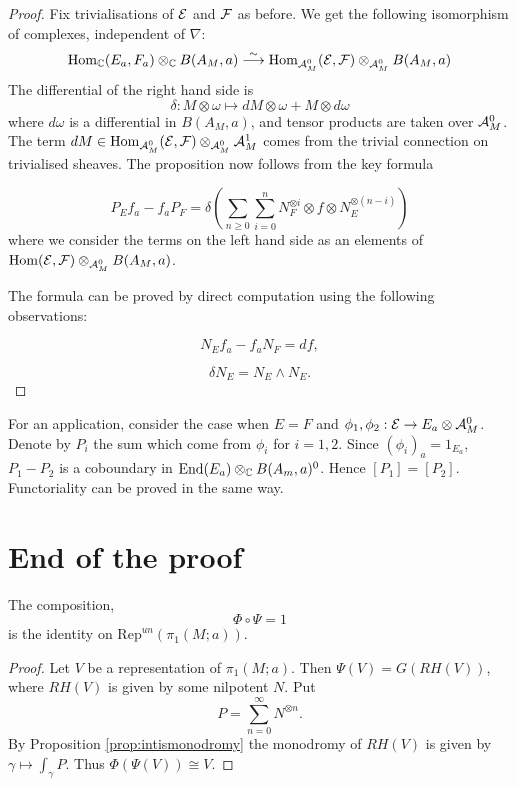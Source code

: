 \begin{proof}
Fix trivialisations of $\mathcal{E}$ and $\mathcal{F}$ as before. We get the following isomorphism of complexes, independent of $\nabla$:
\[
\mathrm{Hom}_{\mathbb{C}}(E_a,F_a) \otimes_{\mathbb{C}} B(A_M,a) \stackrel{\sim}{\longrightarrow} \mathrm{Hom}_{\mathcal{A}^0_M}(\mathcal{E},\mathcal{F}) \otimes_{\mathcal{A}^0_M} B(A_M,a)
\]
The differential of the right hand side is
\[
\delta : M \otimes \omega \mapsto dM \otimes \omega + M \otimes d\omega
\]
where $d\omega$ is a differential in $B(A_M,a)$, and tensor products are taken over $\mathcal{A}^0_M$.
The term $dM \in \mathrm{Hom}_{\mathcal{A}_M^0}(\mathcal{E},\mathcal{F}) \otimes_{\mathcal{A}^0_M} \mathcal{A}^1_M$ comes from the trivial connection on trivialised sheaves. The proposition now follows from the key formula

\[
P_E f_a - f_a P_F = \delta \left( \sum_{n \geq 0} \sum_{i=0}^n N^{\otimes i}_F \otimes f \otimes N^{\otimes(n-i)}_E \right)
\]
where we consider the terms on the left hand side as an elements of $\mathrm{Hom}(\mathcal{E},\mathcal{F}) \otimes_{\mathcal{A}^0_M} B(A_M, a)$.

The formula can be proved by direct computation using the following observations:

\[
N_E f_a - f_a N_F = df,
\]

\[
\delta N_E=N_E\wedge N_E.
\]

\end{proof}

For an application, consider the case when $E = F$ and $\phi_1, \phi_2 : \mathcal{E} \to E_a \otimes \mathcal{A}_M^0$. Denote by $P_i$ the sum which come from $\phi_i$ for $i=1,2$. Since $(\phi_i)_a=1_{E_a}$, $P_1 - P_2$ is a coboundary in $\mathrm{End}(E_a) \otimes_{\mathbb{C}} B(A_m,a)^0$. Hence $[P_1] = [P_2]$. Functoriality can be proved in the same way.


\section{End of the proof}

\begin{prop}
The composition,
\[
\Phi \circ \Psi = 1
\]
is the identity on $\mathrm{Rep}^{un}(\pi_1(M;a))$.
\end{prop}
\begin{proof}
Let $V$ be a representation of $\pi_1(M;a)$. Then $\Psi(V) = G(RH(V))$, where $RH(V)$ is given by some nilpotent $N$. Put 
\[
P = \sum_{n=0}^{\infty} N^{\otimes n}.
\]
By Proposition \ref{prop:intismonodromy} the monodromy of $RH(V)$ is given by $\gamma \mapsto \int_{\gamma} P$.
Thus $\Phi(\Psi(V))\cong V$.
\end{proof}

